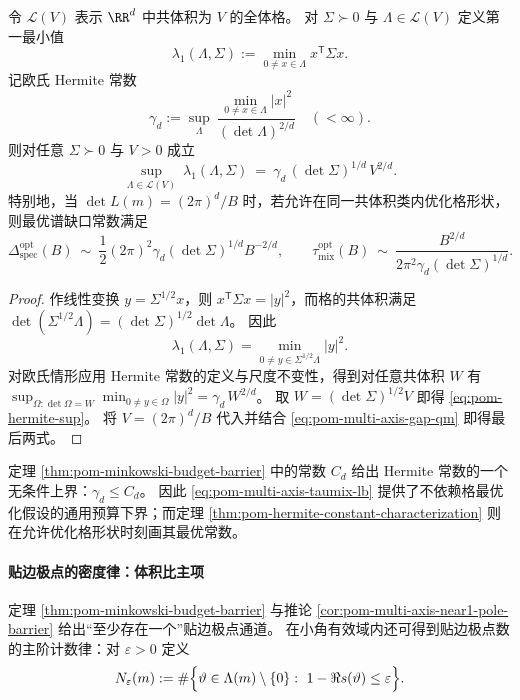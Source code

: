 \begin{theorem}\label{thm:pom-hermite-constant-characterization}
令 \(\mathcal{L}(V)\) 表示 \(\RR^d\) 中共体积为 \(V\) 的全体格。
对 \(\Sigma\succ 0\) 与 \(\Lambda\in\mathcal{L}(V)\) 定义第一最小值
\[
\lambda_1(\Lambda,\Sigma):=\min_{0\neq x\in\Lambda}x^{\mathsf T}\Sigma x.
\]
记欧氏 Hermite 常数
\[
\gamma_d:=\sup_{\Lambda}\ \frac{\min_{0\neq x\in\Lambda}|x|^{2}}{(\det\Lambda)^{2/d}}\quad(<\infty).
\]
则对任意 \(\Sigma\succ 0\) 与 \(V>0\) 成立
\begin{equation}\label{eq:pom-hermite-sup}
\sup_{\Lambda\in\mathcal{L}(V)}\ \lambda_1(\Lambda,\Sigma)
\ =\ \gamma_d\,(\det\Sigma)^{1/d}\,V^{2/d}.
\end{equation}
特别地，当 \(\det L(m)=(2\pi)^d/B\) 时，若允许在同一共体积类内优化格形状，则最优谱缺口常数满足
\[
\Delta_{\mathrm{spec}}^{\mathrm{opt}}(B)\ \sim\ \frac12(2\pi)^2\gamma_d(\det\Sigma)^{1/d}B^{-2/d},
\qquad
\tau_{\mathrm{mix}}^{\mathrm{opt}}(B)\ \sim\ \frac{B^{2/d}}{2\pi^2\gamma_d(\det\Sigma)^{1/d}}.
\]
\end{theorem}

\begin{proof}
作线性变换 \(y=\Sigma^{1/2}x\)，则 \(x^{\mathsf T}\Sigma x=|y|^2\)，而格的共体积满足
\(
\det(\Sigma^{1/2}\Lambda)=(\det\Sigma)^{1/2}\det\Lambda
\)。
因此
\[
\lambda_1(\Lambda,\Sigma)
=\min_{0\neq y\in\Sigma^{1/2}\Lambda}|y|^2.
\]
对欧氏情形应用 Hermite 常数的定义与尺度不变性，得到对任意共体积 \(W\) 有
\(
\sup_{\Omega:\det\Omega=W}\min_{0\neq y\in\Omega}|y|^2=\gamma_d\,W^{2/d}
\)。
取 \(W=(\det\Sigma)^{1/2}V\) 即得 \eqref{eq:pom-hermite-sup}。
将 \(V=(2\pi)^d/B\) 代入并结合 \eqref{eq:pom-multi-axis-gap-qm} 即得最后两式。
\end{proof}

\begin{remark}\label{rem:pom-minkowski-vs-hermite}
定理 \ref{thm:pom-minkowski-budget-barrier} 中的常数 \(C_d\) 给出 Hermite 常数的一个无条件上界：\(\gamma_d\le C_d\)。
因此 \eqref{eq:pom-multi-axis-taumix-lb} 提供了不依赖格最优化假设的通用预算下界；而定理 \ref{thm:pom-hermite-constant-characterization} 则在允许优化格形状时刻画其最优常数。
\end{remark}

\paragraph{贴边极点的密度律：体积比主项}
定理 \ref{thm:pom-minkowski-budget-barrier} 与推论 \ref{cor:pom-multi-axis-near1-pole-barrier} 给出“至少存在一个”贴边极点通道。
在小角有效域内还可得到贴边极点数的主阶计数律：对 \(\varepsilon>0\) 定义
\[
N_\varepsilon(m):=\#\Bigl\{\vartheta\in \Lambda(m)\setminus\{0\}:\ 1-\Re s(\vartheta)\le \varepsilon\Bigr\}.
\]

